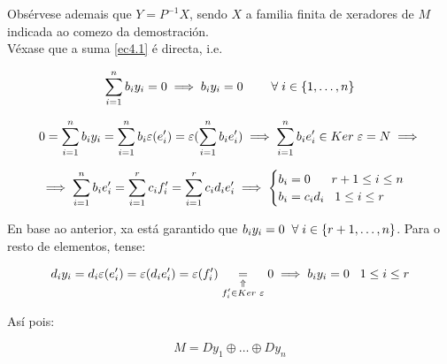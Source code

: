 \documentclass[twoside]{report}
\theoremstyle{mystyle}
\begin{document}
\noindent Obsérvese ademais que $Y = P^{-1}X$, sendo $X$ a familia finita de xeradores de $M$ indicada ao comezo da demostración.\\

\noindent Véxase que a suma \eqref{ec4.1} é directa, i.e. 

$$\displaystyle \sum_{i = 1}^{n}b_{i}y_{i} = 0 \implies b_{i}y_{i} = 0 \hspace{8mm} \forall \hspace{1mm} i \in \{1, \dots, n\}$$

\vspace{3mm}

$$
0 = \displaystyle \sum_{i = 1}^{n}b_{i}y_{i} = \sum_{i = 1}^{n}b_{i}\varepsilon (e'_{i}) = \varepsilon (\sum_{i = 1}^{n}b_{i}e'_{i}) 
\implies \sum_{i=1}^{n}b_{i}e'_{i} \in Ker \hspace{1mm} \varepsilon = N \implies
$$

$$
\implies \displaystyle \sum_{i = 1}^{n}b_{i}e'_{i} = \sum_{i = 1}^{r}c_{i}f'_{i} = \sum_{i = 1}^{r}c_{i}d_{i}e'_{i} \implies \begin{cases}
b_{i} = 0 \hspace{6mm} r+1 \leq i \leq n\\
b_{i} = c_{i}d_{i} \hspace{3mm} 1 \leq i \leq r
\end{cases}
$$

\vspace{3mm}

\noindent En base ao anterior, xa está garantido que $b_{i}y_{i} = 0 \hspace{2mm} \forall \hspace{1mm} i \in \{r+1, \dots, n\}$. Para o resto de elementos, tense:

$$d_{i}y_{i} = d_{i} \varepsilon(e'_{i}) = \varepsilon(d_{i}e'_{i}) = \varepsilon(f'_{i}) \underset{\substack{\Uparrow \\ f'_{i} \in Ker \hspace{1mm} \varepsilon}}{=} 0 \implies b_{i}y_{i} = 0 \hspace{3mm} 1 \leq i \leq r
$$

\vspace{3mm}

\noindent Así pois:

\begin{equation}\label{ec4.2}
    M = Dy_{1} \oplus \dots \oplus Dy_{n}
\end{equation}

\vspace{3mm}
\end{document}
